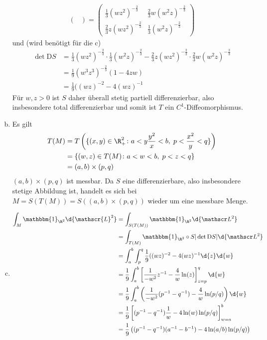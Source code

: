 \documentclass{article}
\begin{document}
\begin{enumerate}[(a)]
\begin{align*}
\begin{pmatrix}
            \end{pmatrix} = \begin{pmatrix}
                \frac{1}{3} (wz^2)^{-\frac{2}{3}} & \frac{2}{3} w (w^2z)^{-\frac{2}{3}}\\[0.3em]
                \frac{2}{3} z (wz^2)^{-\frac{2}{3}} & \frac{1}{3} (w^2z)^{-\frac{2}{3}}
            \end{pmatrix}
        \end{align*}
        und (wird benötigt für die c)
        \begin{align*}
            \det \mathrm{D} S &= \frac{1}{3} (wz^2)^{-\frac{2}{3}} \cdot \frac{1}{3} (w^2z)^{-\frac{2}{3}} - \frac{2}{3} z (wz^2)^{-\frac{2}{3}} \cdot \frac{2}{3} w (w^2z)^{-\frac{2}{3}}\\
            &= \frac{1}{9} (w^3z^3)^{-\frac{2}{3}} \left(1 - 4zw\right)\\
            &= \frac{1}{9} ((wz)^{-2} - 4 (wz)^{-1}
        \end{align*}
        Für $w, z > 0$ ist $S$ daher überall stetig partiell differenzierbar, also insbesondere total differenzierbar und somit ist $T$ ein $C^1$-Diffeomorphismus.
        \item Es gilt
        \begin{align*}
            T(M) &= T\left(\{(x,y) \in \R_+^2\colon a < y \frac{y^2}{x} < b,\; p < \frac{x^2}{y} < q\}\right)\\
            &= \{(w,z) \in T(M)\colon a < w < b,\; p < z < q\}\\
            &= (a,b) \times (p,q)
        \end{align*}
        $(a,b) \times (p,q)$ ist messbar.
        Da $S$ eine differenzierbare, also insbesondere stetige Abbildung ist, handelt es sich bei $M = S(T(M)) = S((a,b) \times (p,q))$ wieder um eine messbare Menge.
        \item 
        \begin{align*}
            \int_M \mathbbm{1}_{\R^2}\d{\mathscr{L}^2} &= \int_{S(T(M))} \mathbbm{1}_{\R^2}\d{\mathscr L^2}\\
            &= \int_{T(M)} \mathbbm{1}_{\R^2} \circ S |\det \mathrm{D}S| \d{\mathscr L^2}\\
            &= \int_a^b \int_p^q \frac{1}{9} ((wz)^{-2} - 4 (wz)^{-1} \d{z}\d{w}\\
            &= \frac{1}{9} \int_a^b \left[\frac{1}{-w^2}z^{-1} - \frac{4}{w} \ln(z)\right]_{z = p}^q \d{w}\\
            &= \frac{1}{9} \int_a^b \left(\frac{1}{-w^2}(p^{-1} - q^{-1})  - \frac{4}{w} \ln(p/q)\right) \d{w}\\
            &= \frac{1}{9} \left[(p^{-1} - q^{-1}) \frac{1}{w} - 4\ln(w)\ln(p/q) \right]_{w=a}^b\\
            &= \frac{1}{9} \left((p^{-1} - q^{-1}) (a^{-1} - b^{-1}) - 4 \ln(a/b)\ln(p/q)\right)
        \end{align*}
    \end{enumerate}
\end{document}
